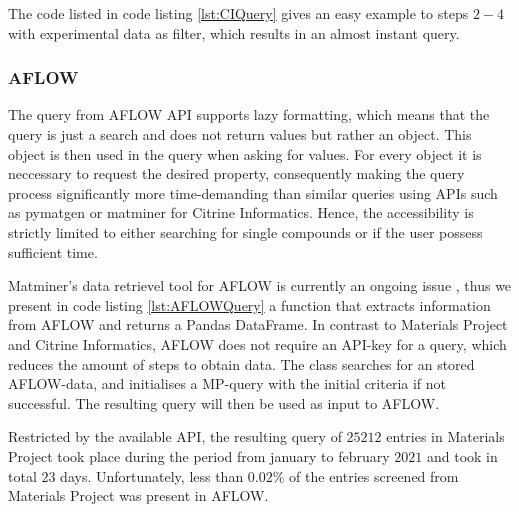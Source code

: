 The code listed in code listing \autoref{lst:CIQuery} gives an easy example to steps $2-4$ with experimental data as filter, which results in an almost instant query.



\subsubsection{AFLOW}

The query from AFLOW API \cite{Curtarolo2012} supports lazy formatting, which means that the query is just a search and does not return values but rather an object. This object is then used in the query when asking for values. For every object it is neccessary to request the desired property, consequently making the query process significantly more time-demanding than similar queries using APIs such as pymatgen or matminer for Citrine Informatics. Hence, the accessibility is strictly limited to either searching for single compounds or if the user possess sufficient time.

Matminer's data retrievel tool for AFLOW is currently an ongoing issue \cite{Rosenbrock2017}, thus we present in code listing \autoref{lst:AFLOWQuery} a function that extracts information from AFLOW and returns a Pandas DataFrame. In contrast to Materials Project and Citrine Informatics, AFLOW does not require an API-key for a query, which reduces the amount of steps to obtain data. The class searches for an stored AFLOW-data, and initialises a MP-query with the initial criteria if not successful. The resulting query will then be used as input to AFLOW.



Restricted by the available API, the resulting query of $25212$ entries in Materials Project took place during the period from january to february $2021$ and took in total $23$ days. Unfortunately, less than $0.02$\% of the entries screened from Materials Project was present in AFLOW.

